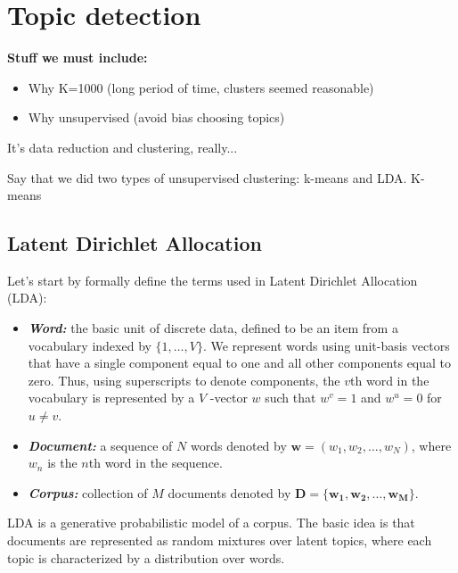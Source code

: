 \section{Topic detection}
\label{sec:topic_detection}

\textbf{Stuff we must include:}
\begin{itemize}
\item Why K=1000 (long period of time, clusters seemed reasonable)
\item Why unsupervised (avoid bias choosing topics)
\end{itemize}

It's data reduction and clustering, really...

Say that we did two types of unsupervised clustering: k-means and LDA. K-means

\subsection{Latent Dirichlet Allocation}
Let's start by formally define the terms used in Latent Dirichlet Allocation (LDA):

\begin{itemize} 
\item \textbf{\textit{Word:}} the basic unit of discrete data, defined to be an item from a vocabulary indexed by
$\{1, \dotsc, V\}$. We represent words using unit-basis vectors that have a single component equal to one and all other components equal to zero. Thus, using superscripts to denote components, the $v$th word in the vocabulary is represented by a $V$ -vector $w$ such that $w^v = 1$ and $w^u = 0$ for $u \neq v$.
\item \textbf{\textit{Document:}}  a sequence of $N$ words denoted by $\mathbf{w} = (w_1, w_2, \dotsc, w_N)$, where $w_n$ is the $n$th word in the sequence.
\item \textbf{\textit{Corpus:}} collection of $M$ documents denoted by $\mathbf{D = \{w_1,w_2, \dotsc, w_M\}}$.
\end{itemize}

LDA is a generative probabilistic model of a corpus. The basic idea is that documents are represented as random mixtures over latent topics, where each topic is characterized by a distribution over words.\cite{blei2003latent}
